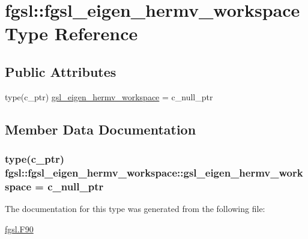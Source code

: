 \hypertarget{structfgsl_1_1fgsl__eigen__hermv__workspace}{}\section{fgsl\+:\+:fgsl\+\_\+eigen\+\_\+hermv\+\_\+workspace Type Reference}
\label{structfgsl_1_1fgsl__eigen__hermv__workspace}
\subsection*{Public Attributes}
\begin{DoxyCompactItemize}
\item 
type(c\+\_\+ptr) \hyperlink{structfgsl_1_1fgsl__eigen__hermv__workspace_a54b4d23aaeb797865f2e898cb8022888}{gsl\+\_\+eigen\+\_\+hermv\+\_\+workspace} = c\+\_\+null\+\_\+ptr
\end{DoxyCompactItemize}


\subsection{Member Data Documentation}
\hypertarget{structfgsl_1_1fgsl__eigen__hermv__workspace_a54b4d23aaeb797865f2e898cb8022888}{}
\subsubsection[{gsl\+\_\+eigen\+\_\+hermv\+\_\+workspace}]{\setlength{\rightskip}{0pt plus 5cm}type(c\+\_\+ptr) fgsl\+::fgsl\+\_\+eigen\+\_\+hermv\+\_\+workspace\+::gsl\+\_\+eigen\+\_\+hermv\+\_\+workspace = c\+\_\+null\+\_\+ptr}\label{structfgsl_1_1fgsl__eigen__hermv__workspace_a54b4d23aaeb797865f2e898cb8022888}


The documentation for this type was generated from the following file\+:\begin{DoxyCompactItemize}
\item 
\hyperlink{fgsl_8F90}{fgsl.\+F90}\end{DoxyCompactItemize}
